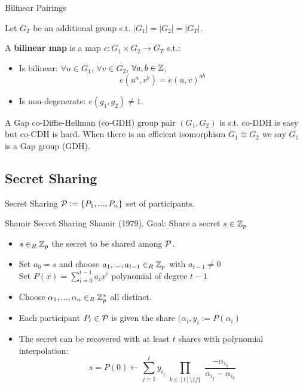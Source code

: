 \begin{frame}{Bilinear Pairings}
\begin{defn}
Let $G_T$ be an additional group s.t. $ |G_1| = |G_2| = |G_T| $. 

A \textbf{bilinear map} is a map $e: G_1 \times G_2 \rightarrow G_T$ s.t.:
\begin{itemize}
\item Is bilinear: $\forall u \in G_1$, $\forall v \in G_2$, $ \forall a,b \in {\mathbb Z}$, $$e(u^a, v^b) = e(u,v)^{ab} $$
\item Is non-degenerate: $e(g_1, g_2) \neq 1$.
\end{itemize}
\end{defn}
\begin{defn}
A Gap co-Diffie-Hellman (co-GDH) group pair $(G_1,G_2)$ is s.t. co-DDH is easy but co-CDH is hard. When there is an efficient isomorphism $G_1 \cong G_2$ we say $G_1$ is a Gap group (GDH).

\end{defn}
\end{frame}



\subsection{Secret Sharing}
\begin{frame}{Secret Sharing}
${\mathcal P} := \{ P_1, ..., P_n\}$ set of participants.
\end{frame}

\begin{frame}{Shamir Secret Sharing}
Shamir (1979). Goal: Share a secret $s \in {\mathbb Z}_p$

\begin{itemize}
\item $s \in_R {\mathbb Z}_p$ the secret to be shared among ${\mathcal P}$.
\item Set $a_0 = s$ and choose $a_1, ... , a_{t-1} \in_R {\mathbb Z}_p$ with $a_{t-1} \neq 0$ \\
        Set $P(x) = \sum_{i=0}^{t-1} a_i x^i$ polynomial of degree $t-1$
\item Choose $\alpha_1, ..., \alpha_n \in_R {\mathbb Z}_p^\ast$ all distinct.
\item Each participant $P_i \in {\mathcal P}$ is given the share $(\alpha_i, y_i := P(\alpha_i)$
\item The secret can be recovered with at least $t$ shares with polynomial interpolation:
$$ s = P(0) \leftarrow \sum_{j=1}^t y_{i_j} \prod_{\substack{k \in [t] \setminus \{j\}}} \frac{-\alpha_{i_k}}{\alpha_{i_j}-\alpha_{i_k}}$$
\end{itemize}


\end{frame}

